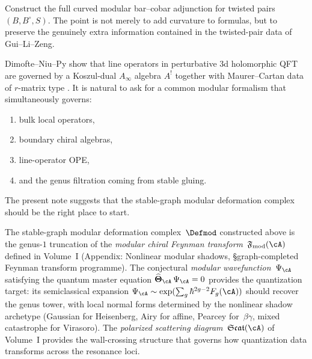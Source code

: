 \begin{question}
Construct the full curved modular bar--cobar adjunction for twisted pairs $(B,B^\circ,S)$.
The point is not merely to add curvature to formulas, but to preserve the genuinely
extra information contained in the twisted-pair data of Gui--Li--Zeng.
\end{question}

\begin{question}
Dimofte--Niu--Py show that line operators in perturbative 3d holomorphic QFT are governed
by a Koszul-dual $A_\infty$ algebra $A^!$ together with Maurer--Cartan data of $r$-matrix
type \cite{DNP25}. It is natural to ask for a common modular formalism that
simultaneously governs:
\begin{enumerate}[leftmargin=2.4em]
\item bulk local operators,
\item boundary chiral algebras,
\item line-operator OPE,
\item and the genus filtration coming from stable gluing.
\end{enumerate}
The present note suggests that the stable-graph modular deformation complex should be the
right place to start.
\end{question}

\begin{remark}
\label{rem:modular-wavefunction-connection}
The stable-graph modular deformation complex~$\Defmod$ constructed above
is the genus-$1$ truncation of the \emph{modular chiral Feynman
transform}~$\mathfrak{F}_{\mathrm{mod}}(\cA)$ defined in
Volume~I (Appendix: Nonlinear modular shadows,
\S\textup{graph-completed Feynman transform programme}).
The conjectural \emph{modular wavefunction}~$\Psi_\cA$ satisfying the
quantum master equation $\widehat{\boldsymbol\Theta}_\cA\,\Psi_\cA=0$
provides the quantization target: its semiclassical expansion
$\Psi_\cA \sim \exp(\sum_{g} \hbar^{2g-2} F_g(\cA))$ should recover
the genus tower, with local normal forms determined by the nonlinear
shadow archetype (Gaussian for Heisenberg, Airy for affine,
Pearcey for~$\beta\gamma$, mixed catastrophe for Virasoro).
The \emph{polarized scattering diagram}~$\mathfrak{Scat}(\cA)$ of
Volume~I provides the wall-crossing structure that governs how
quantization data transforms across the resonance loci.
\end{remark}

